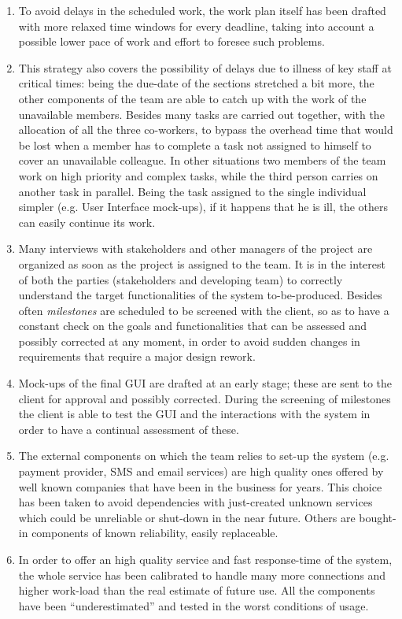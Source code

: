 \documentclass[a4paper,11pt]{report} %
\begin{document}
		\begin{enumerate}
			\item To avoid delays in the scheduled work, the work plan itself has been drafted with more relaxed time windows for every deadline, taking into account a possible lower pace of work and effort to foresee such problems.
			\item This strategy also covers the possibility of delays due to illness of key staff at critical times: being the due-date of the sections stretched a bit more, the other components of the team are able to catch up with the work of the unavailable members. Besides many tasks are carried out together, with the allocation of all the three co-workers, to bypass the overhead time that would be lost when a member has to complete a task not assigned to himself to cover an unavailable colleague. In other situations two members of the team work on high priority and complex tasks, while the third person carries on another task in parallel. Being the task assigned to the single individual simpler (e.g. User Interface mock-ups), if it happens that he is ill, the others can easily continue its work.
			\item Many interviews with stakeholders and other managers of the project are organized as soon as the project is assigned to the team. It is in the interest of both the parties (stakeholders and developing team) to correctly understand the target functionalities of the system to-be-produced. Besides often \textit{milestones} are scheduled to be screened with the client, so as to have a constant check on the goals and functionalities that can be assessed and possibly corrected at any moment, in order to avoid sudden changes in requirements that require a major design rework.
			\item Mock-ups of the final GUI are drafted at an early stage; these are sent to the client for approval and possibly corrected. During the screening of milestones the client is able to test the GUI and the interactions with the system in order to have a continual assessment of these.
			\item The external components on which the team relies to set-up the system (e.g. payment provider, SMS and email services) are high quality ones offered by well known companies that have been in the business for years. This choice has been taken to avoid dependencies with just-created unknown services which could be unreliable or shut-down in the near future. Others are bought-in components of known reliability, easily replaceable.
			\item In order to offer an high quality service and fast response-time of the system, the whole service has been calibrated to handle many more connections and higher work-load than the real estimate of future use. All the components have been ``underestimated'' and tested in the worst conditions of usage.
		\end{enumerate}		
\end{document}
